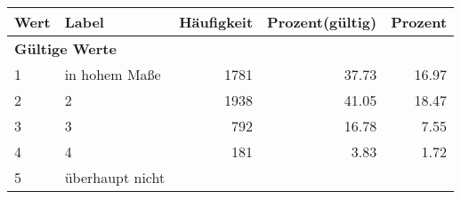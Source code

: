      \begin{longtable}{lXrrr}
     \toprule
     \textbf{Wert} & \textbf{Label} & \textbf{Häufigkeit} & \textbf{Prozent(gültig)} & \textbf{Prozent} \\
     \endhead
     \midrule
     \multicolumn{5}{l}{\textbf{Gültige Werte}}\\

     1 &
     \multicolumn{1}{X}{ in hohem Maße   } &


       \num{1781} &
       \num[round-mode=places,round-precision=2]{37,73} &
         \num[round-mode=places,round-precision=2]{16,97} \\

     2 &
     \multicolumn{1}{X}{ 2   } &


       \num{1938} &
       \num[round-mode=places,round-precision=2]{41,05} &
         \num[round-mode=places,round-precision=2]{18,47} \\

     3 &
     \multicolumn{1}{X}{ 3   } &


       \num{792} &
       \num[round-mode=places,round-precision=2]{16,78} &
         \num[round-mode=places,round-precision=2]{7,55} \\

     4 &
     \multicolumn{1}{X}{ 4   } &


       \num{181} &
       \num[round-mode=places,round-precision=2]{3,83} &
         \num[round-mode=places,round-precision=2]{1,72} \\

     5 &
     \multicolumn{1}{X}{ überhaupt nicht   } &



\end{longtable}
